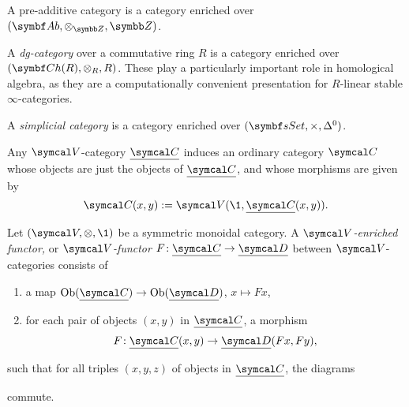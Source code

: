\begin{example}
	A pre-additive category is a category enriched over \((\Ab,\otimes_{\Z},\Z)\).
\end{example}
\begin{example}
	A \emph{dg-category} over a commutative ring \(R\) is a category enriched over \((\Ch(R),\otimes_R,R)\). These play a particularly important role in homological algebra,
	as they are a computationally convenient presentation for \(R\)-linear stable \(\infty\)-categories.
\end{example}
\begin{example}
	A \emph{simplicial category} is a category enriched over \((\sSet,\times,\Delta^0)\).
\end{example}
\begin{remark}
	Any \(\calV\)-category \(\underline\calC\) induces an ordinary category \(\calC\) whose objects are just the objects of \(\underline\calC\), and whose morphisms are given by
	\[ \calC(x,y) := \calV(\1,\underline\calC(x,y)). \]
\end{remark}
\begin{definition}
	Let \((\calV,\otimes,\1)\) be a symmetric monoidal category. A \(\calV\)\emph{-enriched functor,} or \(\calV\)\emph{-functor} \(F\!:\underline\calC\to\underline\calD\) between
	\(\calV\)-categories consists of
	\begin{enumerate}[label=(\arabic*)]
	\item a map \(\Ob(\underline\calC)\to\Ob(\underline\calD)\), \(x\mapsto Fx\),
	\item for each pair of objects \((x,y)\) in \(\underline\calC\), a morphism
	\[ F\!:\underline\calC(x,y)\to\underline\calD(Fx,Fy), \]
	\end{enumerate}
	such that for all triples \((x,y,z)\) of objects in \(\underline\calC\), the diagrams
	\begin{center}
	\quad
	\end{center}
	commute.
\end{definition}

